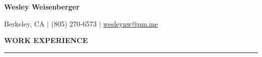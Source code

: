 \documentclass[11pt]{article}
\begin{document}

    \newcommand{\header}[1]{ 
        \vspace{4mm}
        {\large \noindent \textbf{#1}}
        \vspace{2mm}
        \hrule
        \vspace{3mm}
    }

    \begin{center}
        
        {\LARGE \textbf{Wesley Weisenberger}}
    
        \vspace{2mm}

        {\large Berkeley, CA  $\mid$ (805) 270-6573 
            $\mid$
            \href{mailto:wesleynw@pm.me}{wesleynw@pm.me}

        }

    \end{center}


    \header{WORK EXPERIENCE}
\end{document}
